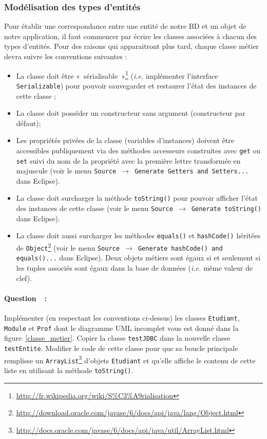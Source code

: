 \documentclass[a4paper,11pt]{article}
\newcounter{compteurQuestion}
\newcommand{\Question}{\paragraph*{Question~\thecompteurQuestion~:}\addtocounter{compteurQuestion}{1}}
\begin{document}
\subsubsection{Modélisation des types d'entités}
Pour établir une correspondance entre une entité de notre BD et un objet de notre application, il faut commencer par 
écrire les classes associées à chacun des types d'entités. Pour des raisons qui apparaitront plus tard, chaque classe 
métier devra suivre les conventions suivantes :
\begin{itemize}
	\item  La classe doit être «~sérialisable~»\footnote{\url{http://fr.wikipedia.org/wiki/S\%C3\%A9rialisation}} 
	(\emph{i.e.} implémenter l'interface \texttt{Serializable}) pour pouvoir sauvegarder et restaurer l'état des instances 
	de cette classe ;
  \item  La classe doit posséder un constructeur sans argument (constructeur par défaut);
  \item  Les propriétés privées de la classe (variables d'instances) doivent être accessibles publiquement via des 
  méthodes accesseurs construites avec \texttt{get} ou \texttt{set} suivi du nom de la propriété avec la première lettre 
  transformée en majuscule (voir le menu \texttt{Source $\rightarrow$ Generate Getters and Setters...} dans Eclipse).
  \item  La classe doit surcharger la méthode \texttt{toString()} pour pouvoir afficher l'état des instances de cette 
  classe (voir le menu \texttt{Source $\rightarrow$ Generate toString()} dans Eclipse).
  \item  La classe doit aussi surcharger les méthodes \texttt{equals()} et \texttt{hashCode()} héritées de 
  \texttt{Object}\footnote{\url{http://download.oracle.com/javase/6/docs/api/java/lang/Object.html}} 
  (voir le menu \texttt{Source $\rightarrow$ Generate hashCode() and equals()...} dans Eclipse). Deux objets métiers
  sont égaux si et seulement si les tuples associés sont égaux dans la base de données (\emph{i.e.} même valeur de clef). 
\end{itemize}

\Question
Implémenter (en respectant les conventions ci-dessus) les classes \texttt{Etudiant}, \texttt{Module} et \texttt{Prof} dont le diagramme 
UML incomplet vous est donné dans la figure~\ref{classe_metier}. Copier la classe \texttt{testJDBC} dans la nouvelle 
classe \texttt{testEntite}. Modifier le code de cette classe pour que sa boucle principale remplisse un 
\texttt{ArrayList}\footnote{\url{http://docs.oracle.com/javase/6/docs/api/java/util/ArrayList.html}} d'objets 
\texttt{Etudiant} et qu'elle affiche le contenu de cette liste en utilisant la méthode \texttt{toString()}.
\end{document}
